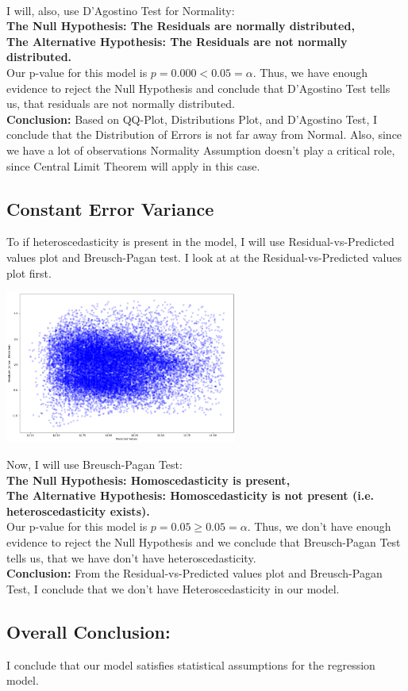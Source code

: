 \documentclass[10pt]{article}
\begin{document}
\\
I will, also, use D'Agostino Test for Normality:\\
\textbf{The Null Hypothesis:  The Residuals are normally distributed,\\
	The Alternative Hypothesis:  The Residuals are not normally distributed.}\\
Our p-value for this model is \(p=0.000 < 0.05 = \alpha\). Thus, we have enough evidence to reject the Null Hypothesis and conclude that D'Agostino Test tells us, that residuals are not normally distributed.\\
\vskip 0.1in
\noindent
\textbf{Conclusion:} Based on QQ-Plot, Distributions Plot, and D'Agostino Test, I conclude that the Distribution of Errors is not far away from Normal. Also, since we have a lot of observations Normality Assumption doesn't play a critical role, since Central Limit Theorem will apply in this case.
\subsection*{Constant Error Variance}
To if heteroscedasticity is present in the model, I will use Residual-vs-Predicted values plot and Breusch-Pagan test.
I look at at the Residual-vs-Predicted values plot first.
\begin{center}
	\includegraphics[width=3in]{residual_plot_linear_model}
\end{center}
Now, I will use Breusch-Pagan Test:\\
\textbf{The Null Hypothesis:  Homoscedasticity is present,\\
	The Alternative Hypothesis:  Homoscedasticity is not present (i.e. heteroscedasticity exists).}\\
Our p-value for this model is \(p=0.05 \ge 0.05 = \alpha\). Thus, we don't have enough evidence to reject the Null Hypothesis and we conclude that Breusch-Pagan Test  tells us, that we have don't have heteroscedasticity.\\
\textbf{Conclusion:} From the Residual-vs-Predicted values plot and  Breusch-Pagan Test, I conclude that we don't have Heteroscedasticity in our model.
\subsection*{Overall Conclusion:} I conclude that our model satisfies statistical assumptions for the regression model.
\end{document}
